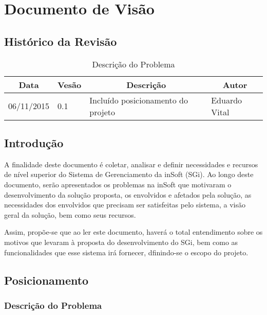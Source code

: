 \chapter{Documento de Visão}

  \section{Histórico da Revisão}

  \begin{table}[H]
    \centering
    \begin{tabular}{|l|l|l|l|}
      \hline
      \multicolumn{1}{|c|}{Data} & \multicolumn{1}{c|}{Vesão} & \multicolumn{1}{c|}{Descrição}     & \multicolumn{1}{c|}{Autor} \\ \hline
      06/11/2015                & 0.1                         & Incluído posicionamento do projeto & Eduardo Vital       \\ \hline
    \end{tabular}
    \caption{Descrição do Problema}
  \end{table}

  \section{Introdução}

    A finalidade deste documento é coletar, analisar e definir necessidades e recursos de nível superior do Sistema de Gerenciamento da inSoft (SGi). Ao longo deste documento, serão apresentados os problemas na inSoft que motivaram o desenvolvimento da solução proposta, os envolvidos e afetados pela solução, as necessidades dos envolvidos que precisam ser satisfeitas pelo sistema, a visão geral da solução, bem como seus recursos.

    Assim, propõe-se que ao ler este documento, haverá o total entendimento sobre os motivos que levaram à proposta do desenvolvimento do SGi, bem como as funcionalidades que esse sistema irá fornecer, dfinindo-se o escopo do projeto.


  \section{Posicionamento}
    \subsection{Descrição do Problema}

